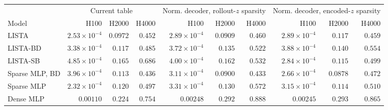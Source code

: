 \begin{tabular}[t]{@{}l rrr rrr rrr@{}}
\toprule
& \multicolumn{3}{c}{Current table} & \multicolumn{3}{c}{Norm. decoder, rollout-\(z\) sparsity} & \multicolumn{3}{c}{Norm. decoder, encoded-\(z\) sparsity} \\
\cmidrule(lr){2-4}\cmidrule(lr){5-7}\cmidrule(l){8-10}
Model & H100 & H2000 & H4000 & H100 & H2000 & H4000 & H100 & H2000 & H4000 \\
\midrule
LISTA & $2.53{\times}10^{-4}$ & $0.0972$ & $0.452$ & $2.89{\times}10^{-4}$ & $0.0909$ & $0.460$ & $2.89{\times}10^{-4}$ & $0.117$ & $0.459$ \\
LISTA-BD & $3.38{\times}10^{-4}$ & $0.117$ & $0.485$ & $3.72{\times}10^{-4}$ & $0.135$ & $0.522$ & $3.88{\times}10^{-4}$ & $0.140$ & $0.554$ \\
LISTA-SB & $4.85{\times}10^{-4}$ & $0.165$ & $0.686$ & $4.00{\times}10^{-4}$ & $0.162$ & $0.532$ & $2.84{\times}10^{-4}$ & $0.115$ & $0.499$ \\
Sparse MLP, BD & $3.96{\times}10^{-4}$ & $0.113$ & $0.436$ & $3.11{\times}10^{-4}$ & $0.0900$ & $0.433$ & $2.66{\times}10^{-4}$ & $0.0878$ & $0.472$ \\
Sparse MLP & $2.32{\times}10^{-4}$ & $0.120$ & $0.497$ & $3.31{\times}10^{-4}$ & $0.130$ & $0.572$ & $3.15{\times}10^{-4}$ & $0.114$ & $0.510$ \\
\midrule
Dense MLP & $0.00110$ & $0.224$ & $0.754$ & $0.00248$ & $0.292$ & $0.888$ & $0.00245$ & $0.293$ & $0.865$ \\
\bottomrule
\end{tabular}
